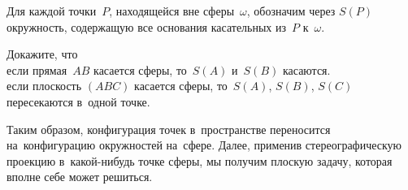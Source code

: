 


\begingroup
    \def\spherex#1{S(#1)}





Для каждой точки~$P$, находящейся вне сферы~$\omega$, обозначим через
$\spherex{P}$ окружность, содержащую все основания касательных из~$P$
к~$\omega$.

\begin{problems}

\item
Докажите, что
\\
\subproblem
если прямая~$AB$ касается сферы, то~$\spherex{A}$ и~$\spherex{B}$ касаются.
\\
\subproblem
если плоскость $(ABC)$ касается сферы,
то~$\spherex{A}$, $\spherex{B}$, $\spherex{C}$ пересекаются в~одной точке.

\end{problems}

Таким образом, конфигурация точек в~пространстве переносится на~конфигурацию
окружностей на~сфере.
Далее, применив стереографическую проекцию в~какой-нибудь точке сферы, мы
получим плоскую задачу, которая вполне себе может решиться.

